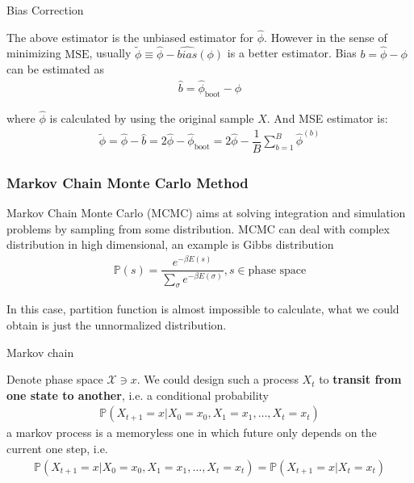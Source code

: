     
\begin{point}
    Bias Correction
\end{point}

    The above estimator is the unbiased estimator for $ \hat{\phi } $. However in the sense of minimizing $ \mathrm{MSE}  $, usually $ \tilde{\phi }\equiv \hat{\phi}-\hat{bias}(\phi) $ is a better estimator. Bias $ b=\hat{\phi }-\phi  $ can be estimated as
    \begin{align}
         \hat{b}=\hat{\phi }_\mathrm{boot}-\hat{\phi } 
    \end{align}
    
    where $ \hat{\phi } $ is calculated by using the original sample $ X $. And MSE estimator is:
    \begin{align}
        \tilde{\phi }= \hat{\phi }-\hat{b}=2\hat{\phi }-\hat{\phi }_\mathrm{boot}=2\hat{\phi }-\dfrac{1}{B}\sum_{b=1}^B\hat{\phi }^{(b)} 
    \end{align}
    
    

\subsubsection{Markov Chain Monte Carlo Method}
Markov Chain Monte Carlo (MCMC) aims at solving integration and simulation problems by sampling from some distribution. MCMC can deal with complex distribution in high dimensional, an example is Gibbs distribution
\begin{align}
    \mathbb{P}\left( s \right) =\dfrac{e^{-\beta E(s)}}{\sum_{\sigma }e^{-\beta E(\sigma )}}, s\in\text{phase space} 
\end{align}

    In this case, partition function is almost impossible to calculate, what we could obtain is just the unnormalized distribution.
    
\begin{point}
    Markov chain
\end{point}

    Denote phase space $ \mathcal{X}\ni x $. We could design such a process $ X_t $ to \textbf{transit from one state to another}, i.e. a conditional probability
    \begin{align}
        \mathbb{P}\left( X_{t+1}=x|X_0=x_0,X_1=x_1,\ldots ,X_t=x_t \right)  
    \end{align}
    a markov process is a memoryless one in which future only depends on the current one step, i.e.
    \begin{align}
        \mathbb{P}\left( X_{t+1}=x|X_0=x_0,X_1=x_1,\ldots ,X_t=x_t \right)  =\mathbb{P}\left( X_{t+1}=x|X_t=x_t \right) 
    \end{align}

